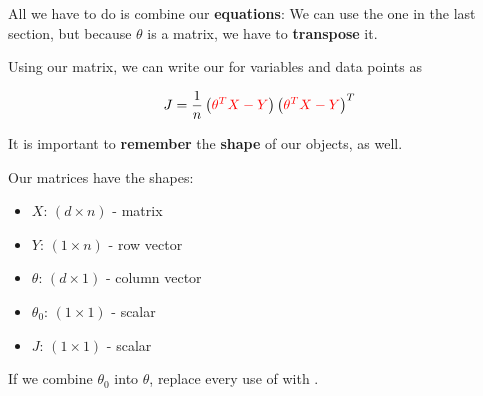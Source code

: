         All we have to do is combine our \textbf{equations}: We can use the one in the last section, but because $\theta$ is a matrix, we have to \textbf{transpose} it.
            \\
        
        \begin{kequation}
            Using our  matrix, we can write our  for  variables and  data points as
            
            \begin{equation*}
                J = \frac{1}{n}
                    \left( \textcolor{red}{ \theta^T X - Y} \right)
                    \left( \textcolor{red}{ \theta^T X - Y} \right)^T
            \end{equation*}
        \end{kequation}
        
        It is important to \textbf{remember} the \textbf{shape} of our objects, as well.\\
        
        \begin{concept}
            Our matrices have the shapes:
            
            \begin{itemize}
                \item $X$:        $(d \times n)$ - matrix
                \item $Y$:        $(1 \times n)$ - row vector\\
                
                \item $\theta$:   $(d \times 1)$ - column vector
                \item $\theta_0$: $(1 \times 1)$ - scalar\\
                
                \item $J$:        $(1 \times 1)$ - scalar
            \end{itemize}
            
            If we combine $\theta_0$ into $\theta$, replace every use of  with .
            
        \end{concept}
        
        
